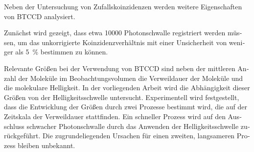 \begin{otherlanguage}{ngerman}
Neben der Untersuchung von Zufallskoinzidenzen werden weitere Eigenschaften von \gls{BTCCD} analysiert. 

Zunächst wird gezeigt, dass etwa \num{10000} Photonschwalle registriert werden müssen, um das unkorrigierte Koinzidenzverhältnis mit einer Unsicherheit von weniger als \SI{5}{\percent} bestimmen zu können.

Relevante Größen bei der Verwendung von \gls{BTCCD} sind neben der mittleren Anzahl der Moleküle im Beobachtungsvolumen die Verweildauer der Moleküle und die molekulare Helligkeit. In der vorliegenden Arbeit wird die Abhängigkeit dieser Größen von der Helligkeitsschwelle untersucht. Experimentell wird festgestellt, dass die Entwicklung der Größen durch zwei Prozesse bestimmt wird, die auf der Zeitskala der Verweildauer stattfinden. Ein schneller Prozess wird auf den Ausschluss schwacher Photonschwalle durch das Anwenden der Helligkeitsschwelle zurückgeführt. Die zugrundeliegenden Ursachen für einen zweiten, langsameren Prozess bleiben unbekannt. 
\end{otherlanguage}
